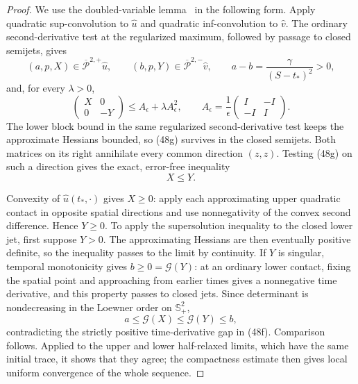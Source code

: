 \documentclass{aomart}
\theoremstyle{definition}
\newcommand{\1}{\mathbf 1}
\begin{document}
\begin{proof}
We use the doubled-variable lemma~\cite{CIL1992} in the following form.
Apply quadratic sup-convolution to $\widehat u$ and quadratic
inf-convolution to $\widehat v$.  The ordinary second-derivative test
at the regularized maximum, followed by passage to closed semijets, gives
\begin{equation}
(a,p,X)\in\overline{\mathcal P}^{2,+}\widehat u,\qquad
(b,p,Y)\in\overline{\mathcal P}^{2,-}\widehat v,\qquad
a-b=\frac{\gamma}{(S-t_ *)^2}>0,
\tag{48f}
\end{equation}
and, for every $\lambda>0$,
\begin{equation}
\begin{pmatrix}X&0\\0&-Y\end{pmatrix}
\leq A_ \epsilon+\lambda A_ \epsilon^2,\qquad
A_ \epsilon=\frac1\epsilon
\begin{pmatrix}I&-I\\-I&I\end{pmatrix}.
\tag{48g}
\end{equation}
The lower block bound in the same regularized second-derivative test
keeps the approximate Hessians bounded, so (48g) survives in the
closed semijets.  Both matrices on its right annihilate every common
direction $(z,z)$.  Testing (48g) on such a direction gives the
exact, error-free inequality
\begin{equation}
X\leq Y.
\tag{48h}
\end{equation}

Convexity of $\widehat u(t_ *,\cdot)$ gives $X\geq0$: apply each
approximating upper quadratic contact in opposite spatial directions
and use nonnegativity of the convex second difference.  Hence $Y\geq0$.
To apply the supersolution inequality to the closed lower jet, first
suppose $Y>0$.  The approximating Hessians are then eventually positive
definite, so the inequality passes to the limit by continuity.
If $Y$ is singular, temporal monotonicity gives $b\geq0=\mathcal G(Y)$:
at an ordinary lower contact, fixing the spatial point and approaching
from earlier times gives a nonnegative time derivative, and this
property passes to closed jets.  Since determinant is nondecreasing
in the Loewner order on $\mathbb S_ +^2$,
\begin{equation*}
a\leq \mathcal G(X)\leq \mathcal G(Y)\leq b,
\end{equation*}
contradicting the strictly positive time-derivative gap in (48f).
Comparison follows.  Applied to the upper and lower half-relaxed
limits, which have the same initial trace, it shows that they agree;
the compactness estimate then gives local uniform convergence of the
whole sequence.


\end{proof}
\end{document}
